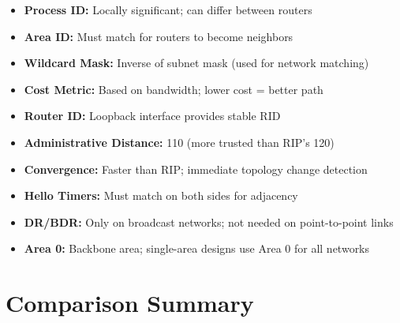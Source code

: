 \documentclass[12pt,a4paper]{article}
\begin{document}
\begin{itemize}
    \item \textbf{Process ID:} Locally significant; can differ between routers
    \item \textbf{Area ID:} Must match for routers to become neighbors
    \item \textbf{Wildcard Mask:} Inverse of subnet mask (used for network matching)
    \item \textbf{Cost Metric:} Based on bandwidth; lower cost = better path
    \item \textbf{Router ID:} Loopback interface provides stable RID
    \item \textbf{Administrative Distance:} 110 (more trusted than RIP's 120)
    \item \textbf{Convergence:} Faster than RIP; immediate topology change detection
    \item \textbf{Hello Timers:} Must match on both sides for adjacency
    \item \textbf{DR/BDR:} Only on broadcast networks; not needed on point-to-point links
    \item \textbf{Area 0:} Backbone area; single-area designs use Area 0 for all networks
\end{itemize}

\newpage

\section{Comparison Summary}
\end{document}
